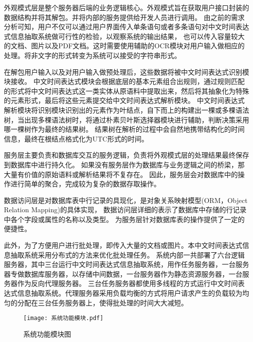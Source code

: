 外观模式层是整个服务器后端的业务逻辑核心。外观模式旨在获取用户接口封装的数据结构并将其解包。并将内部的服务提供给开发人员进行调用。
由之前的需求分析可知，用户不仅可以通过用户界面传入单条语句或者多条语句对中文时间表达式信息抽取系统做可行性的检验，以观察系统的输出结果，
也可以传入容量较大的文档、图片以及PDF文档。这时需要使用辅助的OCR模块对用户输入做相应的处理。将非文字的形式转变为系统可以接受的字符串形式。


在解包用户输入以及对用户输入做预处理后，这些数据将被中文时间表达式识别模块接收。
中文时间表达式模块会根据底层的基本元素组合出规则，通过规则匹配的形式将中文时间表达式这一类实体从原语料中提取出来，然后将其抽象化为特殊的元素形式，最后将这些元素提交给中文时间表达式解析模块。
中文时间表达式解析模块将识别模块识别出的元素作为叶结点，自下而上的构建出一棵或多棵语法树，当出现多棵语法树时，将通过朴素贝叶斯选择器模块进行辅助，判断决策采用哪一棵树作为最终的结果树。
结果树在解析的过程中会自然地携带结构化的时间信息，最终在根结点格式化为UTC形式的时间。

服务层主要负责和数据库交互的服务逻辑，负责将外观模式层的处理结果最终保存到数据库中进行持久化。
如果没有服务层作为数据库与业务逻辑之间的桥梁，那大量有价值的原始语料或解析结果将不复存在。
因此，服务层会对数据库中的操作进行简单的聚合，完成较为复杂的数据存取操作。

数据访问层是对数据库表中行记录的具现化，是对象关系映射模型(ORM，Object Relation Mapping)的具体实现，
数据访问层详细的表示了数据库中存储的行记录中各个字段或属性的名称以及类型。
为服务层针对数据库表的操作提供了一定的便捷性。

此外，为了方便用户进行批处理，即传入大量的文档或图片。本中文时间表达式信息抽取系统采用分布式的方法来优化批处理任务。
系统内部一共部署了六台逻辑服务器，其中三台运行中文时间表达式信息抽取系统，用作任务服务器，一台服务器专做数据库服务器，以存储中间数据，一台服务器作为静态资源服务器，一台服务器作为反向代理服务器。
三台任务服务器都使用多线程的方式运行中文时间表达式信息抽取系统。代理服务器采用负载均衡的方式将用户请求产生的负载较为均匀的分配在三台任务服务器上，使得批处理的时间大大减短。

\begin{figure}[h]
  \centering
  \texttt{[image: 系统功能模块.pdf]}
  \caption{系统功能模块图}
  \label{fig:system_feature}
\end{figure}


